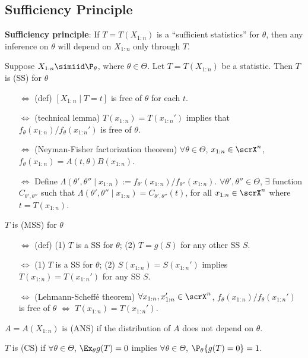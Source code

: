 \documentclass[10pt,a4paper]{article}
\begin{document}
\subsection{Sufficiency Principle}\label{sec:prin-data-reduce-suff}
\textbf{Sufficiency principle}: If $T=T(X_{1:n})$ is a ``sufficient statistics'' for $\theta$, then any inference on $\theta$ will depend on $X_{1:n}$ only through $T$.

\begin{defbox}
	\begin{definition}\label{def:stat-SS-MSS-ANS-CS}
		Suppose $X_{1:n}\simiid \P_{\theta}$, where $\theta\in\Theta$. Let $T=T(X_{1:n})$ be a statistic. Then $T$ is  (SS) for $\theta$
		\begin{itemize}
			\item[$\Leftrightarrow$] (def) $[X_{1:n}\mid T=t]$ is free of $\theta$ for each $t$.
			\item[$\Leftrightarrow$] (technical lemma) $T(x_{1:n})=T(x_{1:n}')$ implies that $f_{\theta}(x_{1:n})/f_{\theta}(x_{1:n}')$ is free of $\theta$.
			\item[$\Leftrightarrow$] (Neyman-Fisher factorization theorem) $\forall\theta\in\Theta$, $x_{1:n}\in\scrX^n$, $f_\theta(x_{1:n})=A(t,\theta)B(x_{1:n})$.
		\item[$\Leftrightarrow$] Define $\Lambda(\theta',\theta''\mid x_{1:n}):=f_{\theta'}(x_{1:n})/f_{\theta''}(x_{1:n})$. $\forall \theta',\theta''\in\Theta$, $\exists$ function $C_{\theta',\theta''}$ such that $\Lambda(\theta',\theta''\mid x_{1:n})=C_{\theta',\theta''}(t)$, for all $x_{1:n}\in\scrX^n$ where $t=T(x_{1:n})$.    
		\end{itemize}
	$T$ is  (MSS) for $\theta$
	\begin{itemize}
		\item[$\Leftrightarrow$] (def) (1) $T$ is a SS for $\theta$; (2) $T=g(S)$ for any other SS $S$.
		\item[$\Leftrightarrow$] (1) $T$ is a SS for $\theta$; (2) $S(x_{1:n})=S(x_{1:n}')$ implies $T(x_{1:n})=T(x_{1:n}')$ for any SS $S$.   
		\item[$\Leftrightarrow$] (Lehmann-Scheffé theorem) $\forall x_{1:n},x_{1:n}'\in\scrX^n$, $f_{\theta}(x_{1:n})/f_{\theta}(x_{1:n}')$ is free of $\theta$ $\Leftrightarrow$ $T(x_{1:n})=T(x_{1:n}')$.    
	\end{itemize}
	$A=A(X_{1:n})$ is  (ANS) if the distribution of $A$ does not depend on $\theta$. 

	\noindent $T$ is  (CS) if $\forall\theta\in\Theta$, $\Ex_{\theta}g(T)=0$ implies $\forall\theta\in\Theta$, $\P_{\theta}\{g(T)=0\}=1$. 
	\end{definition}
\end{defbox}
\end{document}
